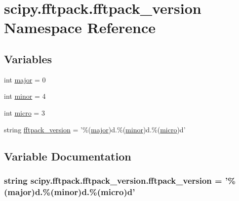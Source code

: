 \hypertarget{namespacescipy_1_1fftpack_1_1fftpack__version}{}\section{scipy.\+fftpack.\+fftpack\+\_\+version Namespace Reference}
\label{namespacescipy_1_1fftpack_1_1fftpack__version}
\subsection*{Variables}
\begin{DoxyCompactItemize}
\item 
int \hyperlink{namespacescipy_1_1fftpack_1_1fftpack__version_a2736799abfd598a523f8111df75a5d52}{major} = 0
\item 
int \hyperlink{namespacescipy_1_1fftpack_1_1fftpack__version_a2b2de30b08a1401ef27548ed6a0c8516}{minor} = 4
\item 
int \hyperlink{namespacescipy_1_1fftpack_1_1fftpack__version_a3c9e099658387f443cb0162329d18185}{micro} = 3
\item 
string \hyperlink{namespacescipy_1_1fftpack_1_1fftpack__version_a63fc7e6e853b8b19635ae02b4a59e610}{fftpack\+\_\+version} = '\%(\hyperlink{namespacescipy_1_1fftpack_1_1fftpack__version_a2736799abfd598a523f8111df75a5d52}{major})d.\%(\hyperlink{namespacescipy_1_1fftpack_1_1fftpack__version_a2b2de30b08a1401ef27548ed6a0c8516}{minor})d.\%(\hyperlink{namespacescipy_1_1fftpack_1_1fftpack__version_a3c9e099658387f443cb0162329d18185}{micro})d'
\end{DoxyCompactItemize}


\subsection{Variable Documentation}
\hypertarget{namespacescipy_1_1fftpack_1_1fftpack__version_a63fc7e6e853b8b19635ae02b4a59e610}{}
\subsubsection[{fftpack\+\_\+version}]{\setlength{\rightskip}{0pt plus 5cm}string scipy.\+fftpack.\+fftpack\+\_\+version.\+fftpack\+\_\+version = '\%({\bf major})d.\%({\bf minor})d.\%({\bf micro})d'}\label{namespacescipy_1_1fftpack_1_1fftpack__version_a63fc7e6e853b8b19635ae02b4a59e610}
\hypertarget{namespacescipy_1_1fftpack_1_1fftpack__version_a2736799abfd598a523f8111df75a5d52}{}
